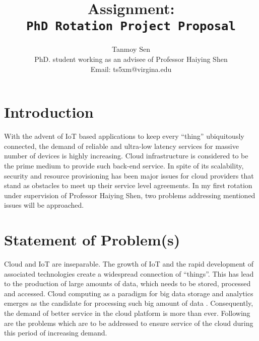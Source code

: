\documentclass[a4paper,10pt]{article}
\title{Assignment:\\\texttt{PhD Rotation Project Proposal}}
\author{Tanmoy Sen \\ PhD. student working as an advisee of Professor Haiying Shen\\
Email: ts5xm@virgina.edu}
\begin{document}
\maketitle

\section{Introduction}
With the advent of IoT based applications to keep every “thing” ubiquitously connected, the demand of reliable and ultra-low latency services for massive number of devices is highly increasing. Cloud infrastructure is considered to be the prime medium to provide such back-end service. In spite of its scalability, security and resource provisioning has been major issues for cloud providers that stand as obstacles to meet up their service level agreements. In my first rotation under supervision of Professor Haiying Shen, two problems addressing mentioned issues will be approached.

\smallskip

\section{Statement of Problem(s)}
Cloud and IoT are inseparable. The growth of IoT and the rapid development of associated technologies create a widespread connection of “things”. This has lead to the production of large amounts of data, which needs to be stored, processed and accessed. Cloud computing as a paradigm for big data storage and analytics emerges as the candidate for processing such big amount of data \cite{website}. Consequently, the demand of better service in the cloud platform is more than ever. Following are the problems which are to be addressed to ensure service of the cloud during this period of increasing demand.
\end{document}
